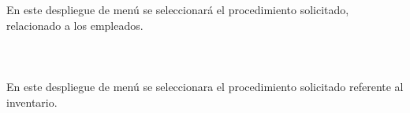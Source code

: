 \\%
\\%
En este despliegue de men\'u se seleccionar\'a el procedimiento solicitado, relacionado a los empleados.
\\%
\\%
\\%
\\%
En este despliegue de men\'u se seleccionara el procedimiento solicitado referente al inventario.
\\%
\\%
\\%
\\%

